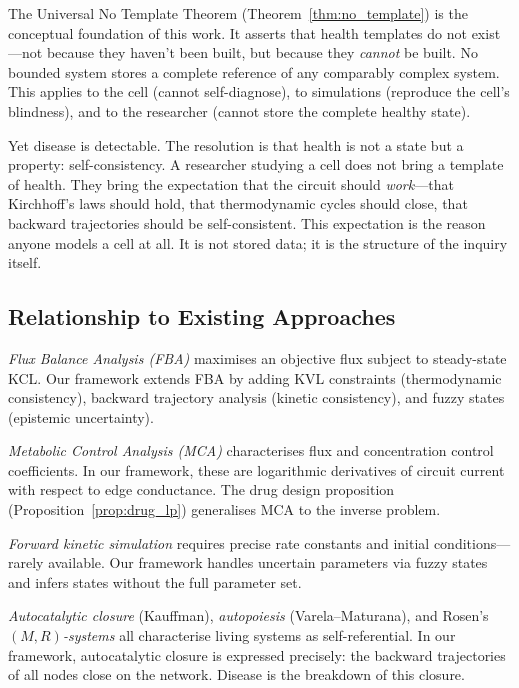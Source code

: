 \documentclass[10pt,twocolumn,a4paper]{article}
\theoremstyle{plain}
\theoremstyle{definition}
\theoremstyle{remark}
\begin{document}
The Universal No Template Theorem (Theorem~\ref{thm:no_template}) is the conceptual foundation of this work. It asserts that health templates do not exist---not because they haven't been built, but because they \emph{cannot} be built. No bounded system stores a complete reference of any comparably complex system. This applies to the cell (cannot self-diagnose), to simulations (reproduce the cell's blindness), and to the researcher (cannot store the complete healthy state).

Yet disease is detectable. The resolution is that health is not a state but a property: self-consistency. A researcher studying a cell does not bring a template of health. They bring the expectation that the circuit should \emph{work}---that Kirchhoff's laws should hold, that thermodynamic cycles should close, that backward trajectories should be self-consistent. This expectation is the reason anyone models a cell at all. It is not stored data; it is the structure of the inquiry itself.

\subsection{Relationship to Existing Approaches}

\emph{Flux Balance Analysis (FBA)} \citep{orth2010} maximises an objective flux subject to steady-state KCL. Our framework extends FBA by adding KVL constraints (thermodynamic consistency), backward trajectory analysis (kinetic consistency), and fuzzy states (epistemic uncertainty).

\emph{Metabolic Control Analysis (MCA)} characterises flux and concentration control coefficients. In our framework, these are logarithmic derivatives of circuit current with respect to edge conductance. The drug design proposition (Proposition~\ref{prop:drug_lp}) generalises MCA to the inverse problem.

\emph{Forward kinetic simulation} requires precise rate constants and initial conditions---rarely available. Our framework handles uncertain parameters via fuzzy states and infers states without the full parameter set.

\emph{Autocatalytic closure} (Kauffman), \emph{autopoiesis} (Varela--Maturana), and Rosen's \emph{$(M, R)$-systems} all characterise living systems as self-referential. In our framework, autocatalytic closure is expressed precisely: the backward trajectories of all nodes close on the network. Disease is the breakdown of this closure.
\end{document}
